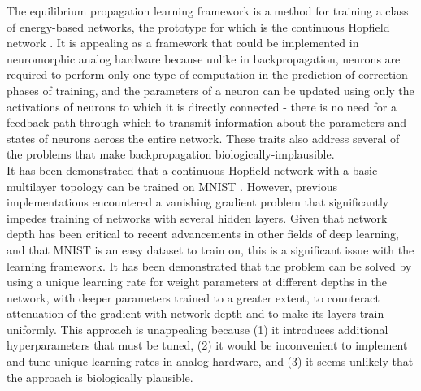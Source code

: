 \documentclass{article}
\newcommand{\npar}{\\\indent}
\begin{document}
The equilibrium propagation learning framework \cite{scellier17} is a method for training a class of energy-based networks, the prototype for which is the continuous Hopfield network \cite{hopfield1984}. It is appealing as a framework that could be implemented in neuromorphic analog hardware because unlike in backpropagation, neurons are required to perform only one type of computation in the prediction of correction phases of training, and the parameters of a neuron can be updated using only the activations of neurons to which it is directly connected - there is no need for a feedback path through which to transmit information about the parameters and states of neurons across the entire network. These traits also address several of the problems \cite{bengio2015} that make backpropagation biologically-implausible.
\npar
It has been demonstrated that a continuous Hopfield network with a basic multilayer topology can be trained on MNIST \cite{mnist1998}. However, previous implementations encountered a vanishing gradient problem that significantly impedes training of networks with several hidden layers. Given that network depth has been critical to recent advancements in other fields of deep learning, and that MNIST is an easy dataset to train on, this is a significant issue with the learning framework. It has been demonstrated that the problem can be solved by using a unique learning rate for weight parameters at different depths in the network, with deeper parameters trained to a greater extent, to counteract attenuation of the gradient with network depth and to make its layers train uniformly. This approach is unappealing because (1) it introduces additional hyperparameters that must be tuned, (2) it would be inconvenient to implement and tune unique learning rates in analog hardware, and (3) it seems unlikely that the approach is biologically plausible.
\npar
\end{document}
